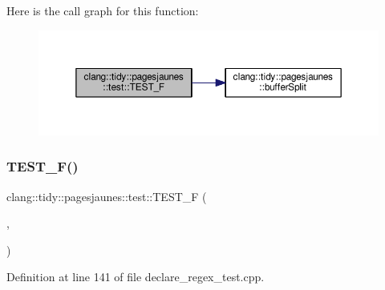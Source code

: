 Here is the call graph for this function\+:
\nopagebreak
\begin{figure}[H]
\begin{center}
\leavevmode
\includegraphics[width=350pt]{namespaceclang_1_1tidy_1_1pagesjaunes_1_1test_adb93e03e4a6b2fa98585f02022bf570f_cgraph}
\end{center}
\end{figure}
\mbox{\label{namespaceclang_1_1tidy_1_1pagesjaunes_1_1test_aaa3c4ff6200f2363ea4b6b6f956b1463}} 
\subsubsection{\texorpdfstring{T\+E\+S\+T\+\_\+\+F()}{TEST\_F()}\hspace{0.1cm}{\footnotesize\ttfamily [32/57]}}
{\footnotesize\ttfamily clang\+::tidy\+::pagesjaunes\+::test\+::\+T\+E\+S\+T\+\_\+F (\begin{DoxyParamCaption}\item[{\hyperlink{classclang_1_1tidy_1_1pagesjaunes_1_1test_1_1_declare_regex_test}{Declare\+Regex\+Test}}]{,  }\item[{Regex\+Matching\+Weird\+Syntax}]{ }\end{DoxyParamCaption})}



Definition at line 141 of file declare\+\_\+regex\+\_\+test.\+cpp.

